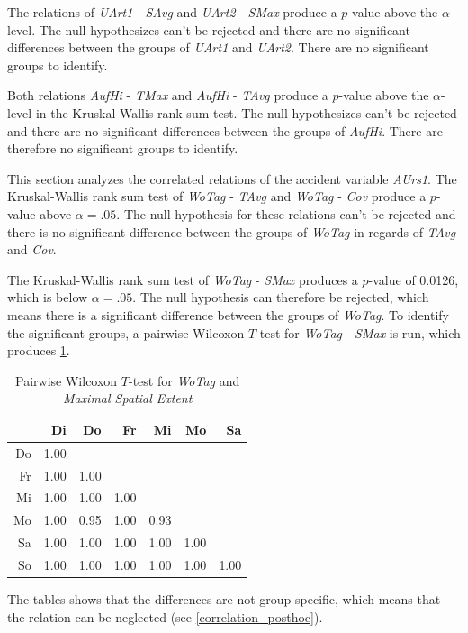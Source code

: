 The relations of \textit{UArt1} - \textit{SAvg} and \textit{UArt2} - \textit{SMax} produce a $p$-value above the $\alpha$-level. The null hypothesizes can't be rejected and there are no significant differences between the groups of \textit{UArt1} and \textit{UArt2}. There are no significant groups to identify.

Both relations \textit{AufHi} - \textit{TMax} and \textit{AufHi} - \textit{TAvg} produce a $p$-value above the $\alpha$-level in the Kruskal-Wallis rank sum test. The null hypothesizes can't be rejected and there are no significant differences between the groups of \textit{AufHi}. There are therefore no significant groups to identify.

This section analyzes the correlated relations of the accident variable \textit{AUrs1}. The Kruskal-Wallis rank sum test of \textit{WoTag} - \textit{TAvg} and \textit{WoTag} - \textit{Cov} produce a $p$-value above $\alpha=.05$. The null hypothesis for these relations can't be rejected and there is no significant difference between the groups of \textit{WoTag} in regards of \textit{TAvg} and \textit{Cov}.

The Kruskal-Wallis rank sum test of \textit{WoTag} - \textit{SMax} produces a $p$-value of 0.0126, which is below $\alpha=.05$. The null hypothesis can therefore be rejected, which means there is a significant difference between the groups of \textit{WoTag}. To identify the significant groups, a pairwise Wilcoxon $T$-test for \textit{WoTag} - \textit{SMax} is run, which produces \cref{tbl:wilcoxon_baysis_effector_WoTag_TMax}. 
\begin{table}[ht!]
	\tiny
	\centering
	\begin{tabular}{rrrrrrr}
		\toprule
		   & Di & Do & Fr & Mi & Mo & Sa \\ 
		\midrule
		Do & 1.00 &  &  &  &  &  \\ 
		Fr & 1.00 & 1.00 &  &  &  &  \\ 
		Mi & 1.00 & 1.00 & 1.00 &  &  &  \\ 
		Mo & 1.00 & 0.95 & 1.00 & 0.93 &  &  \\ 
		Sa & 1.00 & 1.00 & 1.00 & 1.00 & 1.00 &  \\ 
		So & 1.00 & 1.00 & 1.00 & 1.00 & 1.00 & 1.00 \\ 
		\bottomrule
	  \end{tabular}
    \caption{Pairwise Wilcoxon $T$-test for \textit{WoTag} and \textit{Maximal Spatial Extent}}
    \label{tbl:wilcoxon_baysis_effector_WoTag_TMax}
\end{table}
The tables shows that the differences are not group specific, which means that the relation can be neglected (see \cref{correlation_posthoc}).

